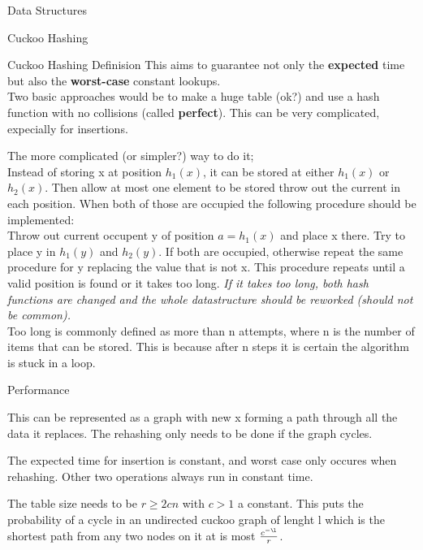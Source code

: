 \documentclass[12pt, letterpaper]{article}
\begin{document}
\begin{section}{Data Structures}
\begin{subsection}{Cuckoo Hashing}
\begin{subsubsection}{Cuckoo Hashing Definision}
      This aims to guarantee not only the \textbf{expected} time but also the
      \textbf{worst-case} constant lookups. \\
      Two basic approaches would be to make a huge table (ok?) and use a hash
      function with no collisions (called \textbf{perfect}). This can be very
      complicated, expecially for insertions.

      The more complicated (or simpler?) way to do it; \\
      Instead of storing x at position \(h_{1}(x)\), it can be stored at either
      \(h_{1}(x)\) or \(h_{2}(x)\). Then allow at most one element to be stored
      throw out the current in each position. When both of those are occupied
      the following procedure should be implemented: \\
      Throw out current occupent y of position \(a = h_{1}(x)\) and place x
      there. Try to place y in \(h_{1}(y)\) and \(h_{2}(y)\). If both are
      occupied, otherwise repeat the same procedure for y replacing the value
      that is not x. This procedure repeats until a valid position is found or
      it takes too long. \textit{If it takes too long, both hash functions are
        changed and the whole datastructure should be reworked (should not be
        common).} \\
      Too long is commonly defined as more than n attempts, where n is the
      number of items that can be stored. This is because after n steps it is
      certain the algorithm is stuck in a loop.

    \end{subsubsection}

    \begin{subsubsection}{Performance}

      This can be represented as a graph with new x forming a path through all
      the data it replaces. The rehashing only needs to be done if the graph
      cycles.

      The expected time for insertion is constant, and worst case only occures
      when rehashing. Other two operations always run in constant time.

      The table size needs to be \(r \geq 2cn\) with \(c > 1\) a constant. This
      puts the probability of a cycle in an undirected cuckoo graph of lenght
      l which is the shortest path from any two nodes on it at is most
      \(\frac{c^{-\l}}{r}\).

    \end{subsubsection}


\end{subsection}
\end{section}
\end{document}
